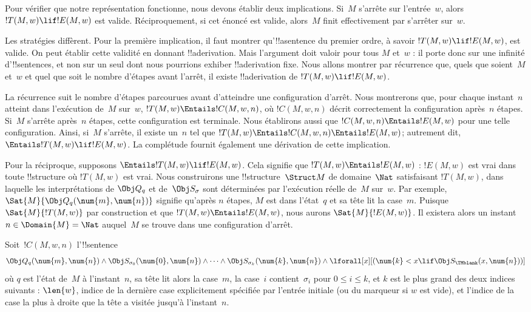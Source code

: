 \documentclass[../../../include/open-logic-section]{subfiles}
\begin{document}

\begin{explain}
Pour vérifier que notre représentation fonctionne, nous devons
établir deux implications. Si~$M$ s'arrête sur l'entrée~$w$, alors
$!T(M,w)\lif !E(M,w)$ est valide. Réciproquement, si cet énoncé est
valide, alors~$M$ finit effectivement par s'arrêter sur~$w$.

Les stratégies diffèrent. Pour la première implication, il faut
montrer qu'!!a{sentence} du premier ordre, à savoir
$!T(M,w)\lif !E(M,w)$, est valide. On peut établir cette validité
en donnant !!a{derivation}. Mais l'argument doit valoir pour tous
$M$ et~$w$ : il porte donc sur une infinité d'!!{sentence}s, et
non sur un seul dont nous pourrions exhiber !!a{derivation} fixe.
Nous allons montrer par récurrence que, quels que soient~$M$ et~$w$
et quel que soit le nombre d'étapes avant l'arrêt, il existe
!!a{derivation} de $!T(M,w)\lif !E(M,w)$.

La récurrence suit le nombre d'étapes parcourues avant d'atteindre
une configuration d'arrêt. Nous montrerons que, pour chaque
instant~$n$ atteint dans l'exécution de~$M$ sur~$w$,
$!T(M,w)\Entails !C(M,w,n)$, où $!C(M,w,n)$ décrit correctement
la configuration après~$n$ étapes. Si~$M$ s'arrête après~$n$
étapes, cette configuration est terminale. Nous établirons aussi
que $!C(M,w,n)\Entails !E(M,w)$ pour une telle configuration.
Ainsi, si~$M$ s'arrête, il existe un~$n$ tel que
$!T(M,w)\Entails !C(M,w,n)\Entails !E(M,w)$; autrement dit,
$\Entails !T(M,w)\lif !E(M,w)$. La complétude fournit également
une dérivation de cette implication.

Pour la réciproque, supposons $\Entails !T(M,w)\lif !E(M,w)$.
Cela signifie que $!T(M,w)\Entails !E(M,w)$ : $!E(M,w)$ est vrai
dans toute !!{structure} où $!T(M,w)$ est vrai. Nous construirons
une !!{structure}~$\Struct M$ de domaine~$\Nat$ satisfaisant
$!T(M,w)$, dans laquelle les interprétations de $\Obj Q_q$ et
de~$\Obj S_\sigma$ sont déterminées par l'exécution réelle de~$M$
sur~$w$. Par exemple,
$\Sat{M}{\Obj Q_q(\num{m},\num{n})}$ signifie qu'après $n$ étapes,
$M$ est dans l'état~$q$ et sa tête lit la case~$m$. Puisque
$\Sat{M}{!T(M,w)}$ par construction et que
$!T(M,w)\Entails !E(M,w)$, nous aurons $\Sat{M}{!E(M,w)}$.
Il existera alors un instant~$n\in\Domain{M}=\Nat$ auquel~$M$
se trouve dans une configuration d'arrêt.
\end{explain}

\begin{defn}
Soit~$!C(M,w,n)$ l'!!{sentence}
\[
\Obj Q_q(\num{m},\num{n})\land
\Obj S_{\sigma_0}(\num{0},\num{n})\land\dots\land
\Obj S_{\sigma_k}(\num{k},\num{n})\land
\lforall[x][(\num{k}<x\lif\Obj S_\TMblank(x,\num{n}))]
\]
où $q$ est l'état de~$M$ à l'instant~$n$, sa tête lit alors la
case~$m$, la case~$i$ contient~$\sigma_i$ pour $0\le i\le k$,
et $k$ est le plus grand des deux indices suivants :
$\len{w}$, indice de la dernière case explicitement spécifiée
par l'entrée initiale (ou du marqueur si $w$ est vide), et
l'indice de la case la plus à droite que la tête a visitée
jusqu'à l'instant~$n$.
\end{defn}
\end{document}
